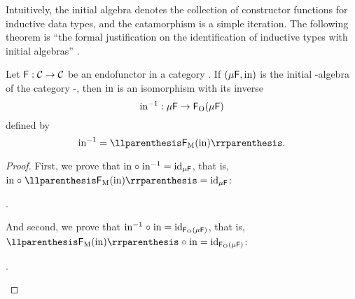 Intuitively, the initial algebra denotes the collection of constructor
functions for inductive data types, and the catamorphism is a simple
iteration. The following theorem is ``the formal justification on the
identification of inductive types with initial algebras''
\parencite[17]{vene-2000}.

\begin{theorem}

  \label{the:lambek}

  Let $\mathsf{F}: \mathcal{C} \to \mathcal{C}$ be an endofunctor in a category
  . If $(\mu\mathsf{F},\operatorname{in})$ is the initial -algebra of
  the category -\alg, then $\operatorname{in}$ is an isomorphism with its
  inverse
  \begin{equation*}
    \operatorname{in}^{-1}: \mu\mathsf{F} \to \mathsf{F}_{\operatorname{O}}(\mu\mathsf{F})
  \end{equation*}
  defined by
  \begin{equation}
    \inmo^{-1} = \cata{\funcM{F}(\inmo)}
    \text{.}
  \end{equation}

  \begin{proof}

    First, we prove that $\operatorname{in} \mathrel{\circ} \operatorname{in}^{-1} = \operatorname{id}_{\mu\mathsf{F}}$,
    that is, $\inmo \comp \cata{\funcM{F}(\inmo)} =
    \idO{\mu\func{F}}$:
    \begin{steps}
      \stepm{\cata\inmo}
        \eqby{\eqref{eq:cata-refl}}
      .
    \end{steps}
    And second, we prove that $\operatorname{in}^{-1} \mathrel{\circ} \operatorname{in} =
    \operatorname{id}_{\mathsf{F}_{\operatorname{O}}(\mu\mathsf{F})}$, that is, $\cata{\funcM{F}(\inmo)}
    \comp \inmo = \idO{\funcO{F}(\mu\func{F})}$:
    \begin{steps}
      .
    \end{steps}

  \end{proof}

\end{theorem}

